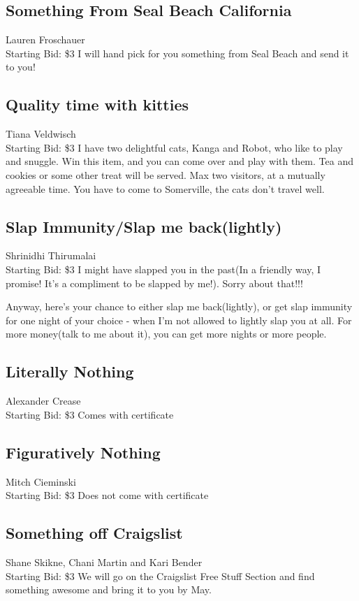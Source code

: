 \documentclass[11pt]{article}
\begin{document}
\subsection{Something From Seal Beach California}
Lauren Froschauer
\\
Starting Bid: \$3
\newline
I will hand pick for you something from Seal Beach and send it to you!
\subsection{Quality time with kitties}
Tiana Veldwisch
\\
Starting Bid: \$3
\newline
I have two delightful cats, Kanga and Robot, who like to play and snuggle. Win this item, and you can come over and play with them. Tea and cookies or some other treat will be served. Max two visitors, at a mutually agreeable time. You have to come to Somerville, the cats don't travel well.
\subsection{Slap Immunity/Slap me back(lightly)}
Shrinidhi Thirumalai
\\
Starting Bid: \$3
\newline
I might have slapped you in the past(In a friendly way, I promise! It's a compliment to be slapped by me!). Sorry about that!!!

Anyway, here's your chance to either slap me back(lightly), or get slap immunity for one night of your choice - when I'm not allowed to lightly slap you at all. For more money(talk to me about it), you can get more nights or more people.
\subsection{Literally Nothing}
Alexander Crease
\\
Starting Bid: \$3
\newline
Comes with certificate
\subsection{Figuratively Nothing}
Mitch Cieminski
\\
Starting Bid: \$3
\newline
Does not come with certificate
\subsection{Something off Craigslist}
Shane Skikne, Chani  Martin and Kari Bender
\\
Starting Bid: \$3
\newline
We will go on the Craigslist Free Stuff Section and find something awesome and bring it to you by May.
\end{document}

